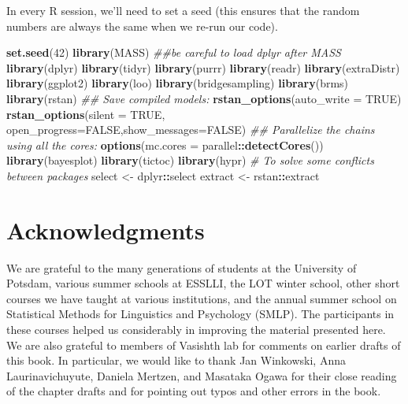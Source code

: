 \documentclass[12pt,]{krantz}
\newenvironment{Shaded}{\begin{snugshade}}{\end{snugshade}}
\newcommand{\CommentTok}[1]{\textcolor[rgb]{0.56,0.35,0.01}{\textit{#1}}}
\newcommand{\DataTypeTok}[1]{\textcolor[rgb]{0.13,0.29,0.53}{#1}}
\newcommand{\DecValTok}[1]{\textcolor[rgb]{0.00,0.00,0.81}{#1}}
\newcommand{\KeywordTok}[1]{\textcolor[rgb]{0.13,0.29,0.53}{\textbf{#1}}}
\newcommand{\NormalTok}[1]{#1}
\newcommand{\OperatorTok}[1]{\textcolor[rgb]{0.81,0.36,0.00}{\textbf{#1}}}
\newcommand{\OtherTok}[1]{\textcolor[rgb]{0.56,0.35,0.01}{#1}}
\newcommand{\StringTok}[1]{\textcolor[rgb]{0.31,0.60,0.02}{#1}}
\theoremstyle{definition}
\theoremstyle{definition}
\theoremstyle{definition}
\theoremstyle{remark}
\begin{document}
In every R session, we'll need to set a seed (this ensures that the random numbers are always the same when we re-run our code).

\begin{Shaded}
\begin{Highlighting}[]
\KeywordTok{set.seed}\NormalTok{(}\DecValTok{42}\NormalTok{)}
\KeywordTok{library}\NormalTok{(MASS)}
\CommentTok{##be careful to load dplyr after MASS}
\KeywordTok{library}\NormalTok{(dplyr)}
\KeywordTok{library}\NormalTok{(tidyr)}
\KeywordTok{library}\NormalTok{(purrr)}
\KeywordTok{library}\NormalTok{(readr)}
\KeywordTok{library}\NormalTok{(extraDistr)}
\KeywordTok{library}\NormalTok{(ggplot2)}
\KeywordTok{library}\NormalTok{(loo)}
\KeywordTok{library}\NormalTok{(bridgesampling)}
\KeywordTok{library}\NormalTok{(brms)}
\KeywordTok{library}\NormalTok{(rstan)}
\CommentTok{## Save compiled models:}
\KeywordTok{rstan_options}\NormalTok{(}\DataTypeTok{auto_write =} \OtherTok{TRUE}\NormalTok{)}
\KeywordTok{rstan_options}\NormalTok{(}\DataTypeTok{silent =} \OtherTok{TRUE}\NormalTok{, }\DataTypeTok{open_progress=}\OtherTok{FALSE}\NormalTok{,}\DataTypeTok{show_messages=}\OtherTok{FALSE}\NormalTok{)}
\CommentTok{## Parallelize the chains using all the cores:}
\KeywordTok{options}\NormalTok{(}\DataTypeTok{mc.cores =}\NormalTok{ parallel}\OperatorTok{::}\KeywordTok{detectCores}\NormalTok{())}
\KeywordTok{library}\NormalTok{(bayesplot)}
\KeywordTok{library}\NormalTok{(tictoc)}
\KeywordTok{library}\NormalTok{(hypr)}
\CommentTok{# To solve some conflicts between  packages}
\NormalTok{select <-}\StringTok{ }\NormalTok{dplyr}\OperatorTok{::}\NormalTok{select}
\NormalTok{extract <-}\StringTok{ }\NormalTok{rstan}\OperatorTok{::}\NormalTok{extract}
\end{Highlighting}
\end{Shaded}

\hypertarget{acknowledgments}{%
\section{Acknowledgments}\label{acknowledgments}}

We are grateful to the many generations of students at the University of Potsdam, various summer schools at ESSLLI, the LOT winter school, other short courses we have taught at various institutions, and the annual summer school on Statistical Methods for Linguistics and Psychology (SMLP). The participants in these courses helped us considerably in improving the material presented here. We are also grateful to members of Vasishth lab for comments on earlier drafts of this book. In particular, we would like to thank Jan Winkowski, Anna Laurinavichuyute, Daniela Mertzen, and Masataka Ogawa for their close reading of the chapter drafts and for pointing out typos and other errors in the book.
\end{document}
